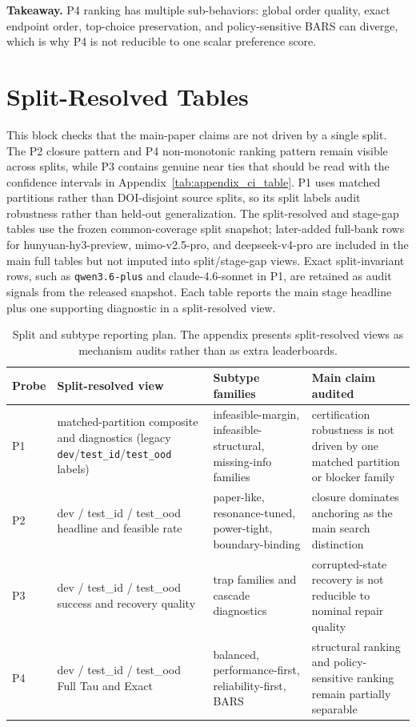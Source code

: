 \noindent\textbf{Takeaway.} P4 ranking has multiple sub-behaviors: global order quality, exact endpoint order, top-choice preservation, and policy-sensitive BARS can diverge, which is why P4 is not reducible to one scalar preference score.

\section{Split-Resolved Tables}

This block checks that the main-paper claims are not driven by a single split. The P2 closure pattern and P4 non-monotonic ranking pattern remain visible across splits, while P3 contains genuine near ties that should be read with the confidence intervals in Appendix~\ref{tab:appendix_ci_table}. P1 uses matched partitions rather than DOI-disjoint source splits, so its split labels audit robustness rather than held-out generalization. The split-resolved and stage-gap tables use the frozen common-coverage split snapshot; later-added full-bank rows for hunyuan-hy3-preview, mimo-v2.5-pro, and deepseek-v4-pro are included in the main full tables but not imputed into split/stage-gap views. Exact split-invariant rows, such as \texttt{qwen3.6-plus} and claude-4.6-sonnet in P1, are retained as audit signals from the released snapshot. Each table reports the main stage headline plus one supporting diagnostic in a split-resolved view.

\begin{table}[t]
\caption{Split and subtype reporting plan. The appendix presents split-resolved views as mechanism audits rather than as extra leaderboards.}
\label{tab:appendix_split_subtype_map}
\centering
\small
\begin{tabular}{lp{28mm}p{32mm}p{42mm}}
\toprule
Probe & Split-resolved view & Subtype families & Main claim audited \\
\midrule
P1 & matched-partition composite and diagnostics (legacy \texttt{dev}/\texttt{test\_id}/\texttt{test\_ood} labels) & infeasible-margin, infeasible-structural, missing-info families & certification robustness is not driven by one matched partition or blocker family \\
P2 & dev / test\_id / test\_ood headline and feasible rate & paper-like, resonance-tuned, power-tight, boundary-binding & closure dominates anchoring as the main search distinction \\
P3 & dev / test\_id / test\_ood success and recovery quality & trap families and cascade diagnostics & corrupted-state recovery is not reducible to nominal repair quality \\
P4 & dev / test\_id / test\_ood Full Tau and Exact & balanced, performance-first, reliability-first, BARS & structural ranking and policy-sensitive ranking remain partially separable \\
\bottomrule
\end{tabular}
\end{table}


